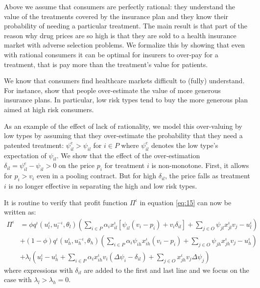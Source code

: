 \documentclass[a4paper,12pt]{article}
\begin{document}
Above we assume that consumers are perfectly rational: they understand the value of the treatments covered by the insurance plan and they know their probability of needing a particular treatment. The main result is that part of the reason why drug prices are so high is that they are sold to a health insurance market with adverse selection problems. We formalize this by showing that even with rational consumers it can be optimal for insurers to over-pay for a treatment, that is pay more than the treatment's value for patients.

We know that consumers find healthcare markets difficult to (fully) understand. For instance, \cite{handel-2015-healt-insur-human} show that people over-estimate the value of more generous insurance plans. In particular, low risk types tend to buy the more generous plan aimed at high risk consumers.

As an example of the effect of lack of rationality, we model this over-valuing by low types by assuming that they over-estimate the probability that they need a patented treatment: \(\psi_{il}^e > \psi_{il}\) for \(i \in P\) where \(\psi_{il}^e\) denotes the low type's expectation of \(\psi_{il}\). We show that the effect of the over-estimation \(\delta_{il} = \psi_{il}^e-\psi_{il}>0\) on the price \(p_i\) for treatment \(i\) is non-monotone. First, it allows for \(p_i>v_i\) even in a pooling contract. But for high \(\delta_{il}\), the price falls as treatment \(i\) is no longer effective in separating the high and low risk types.

It is routine to verify that profit function \(\Pi^{\iota}\) in equation \eqref{eq:15} can now be written as:
\begin{equation}
\label{eq:15b}
\begin{split}
\Pi^{\iota} &= \phi q^{\iota}(u_l^{\iota},u_l^{-\iota},\theta_l) (\sum_{i \in P} \alpha_i x_{il}^{\iota}[\psi_{il}(v_i-p_i)+v_i \delta_{il}] + \sum_{j \in O} \psi_{jl} x_{jl}^{\iota} v_j - u_l^{\iota}) \\
    &+ (1-\phi) q^{\iota}(u_h^{\iota},u_h^{-\iota},\theta_h) (\sum_{i \in P} \alpha_i \psi_{ih} x_{ih}^{\iota} (v_i-p_i) + \sum_{j \in O} \psi_{jh} x_{jh}^{\iota} v_j - u_h^{\iota}) \\
    &+ \lambda_l (u_l^{\iota} - u_h^{\iota} + \sum_{i \in P} \alpha_i x_{ih}^{\iota} v_i (\Delta\psi_{i}-\delta_{il}) + \sum_{j \in O} x_{jh}^{\iota} v_j \Delta\psi_{j})
\end{split}
\end{equation}
where expressions with \(\delta_{il}\) are added to the first and last line and we focus on the case with \(\lambda_l>\lambda_h =0\).
\end{document}
